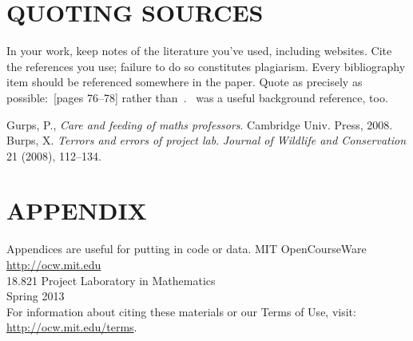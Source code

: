 \documentclass{article}
\begin{document}
\section{QUOTING SOURCES}
In your work, keep notes of the literature you’ve used, including websites. Cite the references you use; failure to do so constitutes plagiarism. Every bibliography item should be referenced somewhere in the paper. Quote as precisely as possible:~\cite{ref1}[pages 76--78] rather than~\cite{itref}.~\cite{itref2} was a useful background reference, too.

\begingroup \renewcommand{\refname}{REFERENCES}
\begin{thebibliography}{9}
	Gurps, P., \emph{Care and feeding of maths professors}. Cambridge Univ. Press, 2008.
	Burps, X. \emph{Terrors and errors of project lab}. \emph{Journal of Wildlife and Conservation} 21 (2008), 112--134.
\end{thebibliography}
\endgroup
\appendix
\section*{APPENDIX}
Appendices are useful for putting in code or data.
\newpage
MIT OpenCourseWare \\
\url{http://ocw.mit.edu} \\
18.821 Project Laboratory in Mathematics \\
Spring 2013 \\
For information about citing these materials or our Terms of Use, visit:
\url{http://ocw.mit.edu/terms}.
\end{document}
